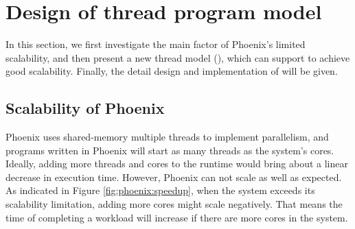 \section{Design of thread program model}
\label{sec:design}
In this section, we first investigate the main factor of Phoenix's limited scalability, 
and then present a new thread model (\myth), which can support \myds to achieve good scalability.
Finally, the detail design and implementation of \myth will be given.


\subsection{Scalability of Phoenix}
Phoenix uses shared-memory multiple threads to implement parallelism, and programs written in Phoenix will start as many threads as the system's cores.
Ideally, adding more threads and cores to the runtime would bring about a linear decrease in execution time.
However, Phoenix can not scale as well as expected.
As indicated in Figure \ref{fig:phoenix:speedup}, when the system exceeds its scalability limitation, adding more cores might scale negatively.
That means the time of completing a workload will increase if there are more cores in the system. 

